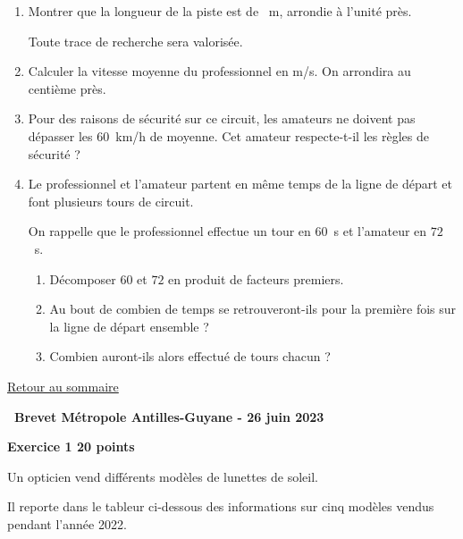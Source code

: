 \documentclass[11pt]{article}
\begin{document}
\begin{enumerate}
\item Montrer que la longueur de la piste est de ~m, arrondie à l'unité près.

Toute trace de recherche sera valorisée.
\item Calculer la vitesse moyenne du professionnel en m/s. On arrondira au centième près.
\item Pour des raisons de sécurité sur ce circuit, les amateurs ne doivent pas dépasser les $60$~km/h de moyenne. Cet amateur respecte-t-il les règles de sécurité ?
\item Le professionnel et l'amateur partent en même temps de la ligne de départ et font plusieurs tours de circuit.

On rappelle que le professionnel effectue un tour en $60$~s et l'amateur en $72$~s.
	\begin{enumerate}
		\item Décomposer $60$ et $72$ en produit de facteurs premiers.
		\item Au bout de combien de temps se retrouveront-ils pour la première fois sur la ligne de départ ensemble ?
		\item Combien auront-ils alors effectué de tours chacun ?
	\end{enumerate}
\end{enumerate}

\hyperlink{sommaire}{Retour au sommaire}
\newpage

\pagestyle{fancy}
\thispagestyle{empty}


\hypertarget{Metropole}{}
\label{Metropole}

\begin{center} {\Large \textbf{\decofourleft~Brevet Métropole Antilles-Guyane - 26 juin 2023 \decofourright}}
\end{center}

\bigskip

{\large \textbf{Exercice 1 \hfill 20 points}}

\medskip

Un opticien vend différents modèles de lunettes de soleil.

Il reporte dans le tableur ci-dessous des informations sur cinq modèles vendus pendant l'année 2022.
\end{document}
